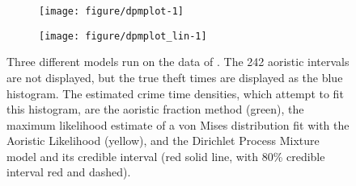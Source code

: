 \begin{figure}
\centering
\begin{subfigure}[b]{0.4\linewidth}
\centering
\begin{knitrout}
\color{fgcolor}
\texttt{[image: figure/dpmplot-1]} 

\end{knitrout}
\caption{} \label{dpmplot_circ}
\end{subfigure}%
\begin{subfigure}[b]{0.6\linewidth}
\centering
\begin{knitrout}
\color{fgcolor}
\texttt{[image: figure/dpmplot\_lin-1]} 

\end{knitrout}
\caption{} \label{dpmplot_lin}
\end{subfigure}%
\caption{Three different models run on the data of \citet{ashby2013comparison}. The 242 aoristic intervals are not displayed, but the true theft times are displayed as the blue histogram.  The estimated crime time densities, which attempt to fit this histogram, are the aoristic fraction method (green), the maximum likelihood estimate of a von Mises distribution fit with the Aoristic Likelihood (yellow), and the Dirichlet Process Mixture model and its credible interval (red solid line, with 80\% credible interval red and dashed).} \label{ab_dpm_plot}
\end{figure}




